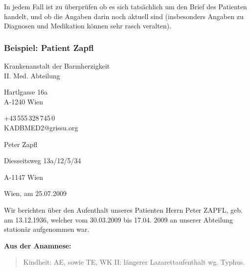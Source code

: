 In jedem Fall ist zu überprüfen ob es sich tatsächlich um den Brief des
Patienten handelt, und ob die Angaben darin noch aktuell sind (insbesonders
Angaben zu Diagnosen und Medikation können sehr rasch veralten).

\subsubsection{Beispiel: Patient Zapfl}







{\selectfont




\begin{flushright}
 Krankenanstalt der Barmherzigkeit \\II. Med. Abteilung
 
 Hartlgasse 16a \\A-1240 Wien
 
+43\,555\,328\,745\,0\\KADBMED2@grissu.org

\end{flushright}

                                                                                               

\vspace{1.5em}
                                                                                                                            


 Peter Zapfl\par
Diesseitsweg 13a/12/5/34 \par
A-1147 Wien
\vspace{3em}

\begin{flushright}
Wien, am 25.07.2009
\end{flushright}

  Wir berichten über den Aufenthalt unseres Patienten Herrn Peter ZAPFL, geb.
  am 13.12.1936, welcher vom 30.03.2009 bis 17.04. 2009 an unserer Abteilung
  stationär aufgenommen war.

{\bfseries   Aus der Anamnese:}

\begin{quote}
  Kindheit: AE, sowie TE, WK II: längerer Lazarettaufenthalt wg.
  Typhus.
  

\end{quote}}
